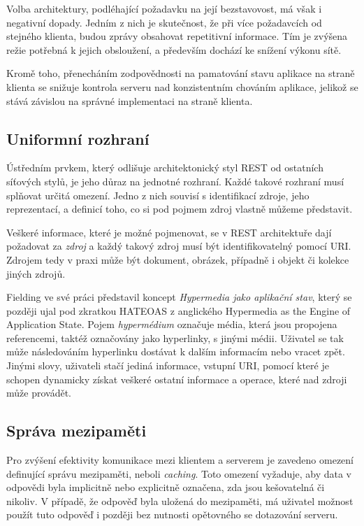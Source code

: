 Volba architektury, podléhající požadavku na její bezstavovost, má však i negativní dopady. Jedním z nich je skutečnost, že při více požadavcích od stejného klienta, budou zprávy obsahovat repetitivní informace. Tím je zvýšena režie potřebná k jejich obsloužení, a především dochází ke snížení výkonu sítě.  

Kromě toho, přenecháním zodpovědnosti na pamatování stavu aplikace na straně klienta se snižuje kontrola serveru nad konzistentním chováním aplikace, jelikož se stává závislou na správné implementaci na straně klienta.


\subsection*{Uniformní rozhraní}
\label{subsec_UniformniRozhrani}

Ústředním prvkem, který odlišuje architektonický styl REST od ostatních síťových stylů, je jeho důraz na jednotné rozhraní. Každé takové rozhraní musí splňovat určitá omezení. Jedno z nich souvisí s identifikací zdroje, jeho reprezentací, a definicí toho, co si pod pojmem zdroj vlastně můžeme představit. 

Veškeré informace, které je možné pojmenovat, se v REST architektuře dají požadovat za \textit{zdroj} a každý takový zdroj musí být identifikovatelný pomocí URI. Zdrojem tedy v praxi může být dokument, obrázek, případně i objekt či kolekce jiných zdrojů.\cite{Roy}

Fielding ve své práci \cite{Roy} představil koncept \textit{Hypermedia jako aplikační stav}, který se později ujal pod zkratkou HATEOAS z anglického Hypermedia as the Engine of Application State. Pojem \textit{hypermédium} označuje média, která jsou propojena referencemi, taktéž označovány jako hyperlinky, s jinými médii. Uživatel se tak může následováním hyperlinku dostávat k dalším informacím nebo vracet zpět. Jinými slovy, uživateli stačí jediná informace, vstupní URI, pomocí které je schopen dynamicky získat veškeré ostatní informace a operace, které nad zdroji může provádět. 


\subsection*{Správa mezipaměti}
\label{subsec_SpravaMezipameti}

Pro zvýšení efektivity komunikace mezi klientem a serverem je zavedeno omezení definující správu mezipaměti, neboli \textit{caching}. Toto omezení vyžaduje, aby data v odpovědi byla implicitně nebo explicitně označena, zda jsou kešovatelná či nikoliv. V případě, že odpověď byla uložená do mezipaměti, má uživatel možnost použít tuto odpověď i později bez nutnosti opětovného se dotazování serveru.


